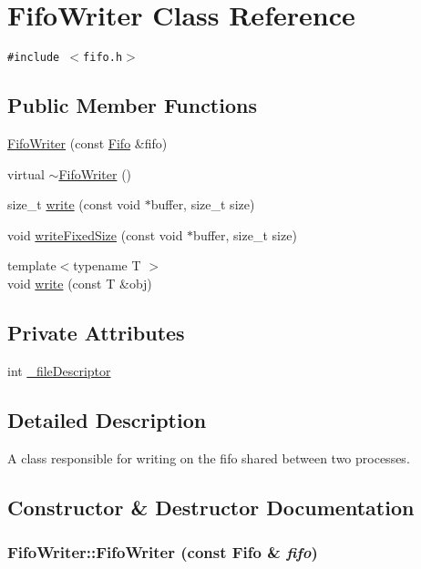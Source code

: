 \hypertarget{classFifoWriter}{
\section{FifoWriter Class Reference}
\label{classFifoWriter}
}
{\tt \#include $<$fifo.h$>$}

\subsection*{Public Member Functions}
\begin{CompactItemize}
\item 
\hyperlink{classFifoWriter_14175cfbc5cec8a4b0974b0b98973af5}{FifoWriter} (const \hyperlink{classFifo}{Fifo} \&fifo)
\item 
virtual \hyperlink{classFifoWriter_06e6742e763b0fff527c9144798a6bc7}{$\sim$FifoWriter} ()
\item 
size\_\-t \hyperlink{classFifoWriter_31bafc8be7fa9c9ef8c316b9fcf5dbd8}{write} (const void $\ast$buffer, size\_\-t size)
\item 
void \hyperlink{classFifoWriter_1edb004e8b962aa5704f3a5a277cc937}{writeFixedSize} (const void $\ast$buffer, size\_\-t size)
\item 
{\footnotesize template$<$typename T $>$ }\\void \hyperlink{classFifoWriter_401c436c46a9320fa3405f56c2a8094d}{write} (const T \&obj)
\end{CompactItemize}
\subsection*{Private Attributes}
\begin{CompactItemize}
\item 
int \hyperlink{classFifoWriter_42cafef03b8826bf3fe2d291d6ef86f4}{\_\-fileDescriptor}
\end{CompactItemize}


\subsection{Detailed Description}
A class responsible for writing on the fifo shared between two processes. 

\subsection{Constructor \& Destructor Documentation}
\hypertarget{classFifoWriter_14175cfbc5cec8a4b0974b0b98973af5}{
\subsubsection[{FifoWriter}]{\setlength{\rightskip}{0pt plus 5cm}FifoWriter::FifoWriter (const {\bf Fifo} \& {\em fifo})}}
\label{classFifoWriter_14175cfbc5cec8a4b0974b0b98973af5}


